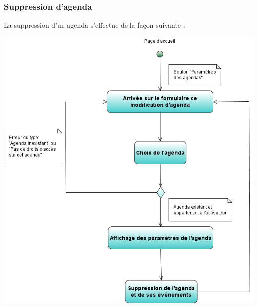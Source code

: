 \documentclass[12pt , a4paper]{article}
\begin{document}
\subsubsection{Suppression d'agenda}
\noindent La suppression d'un agenda s'effectue de la façon suivante :
\begin{center}
  \includegraphics[scale=0.6]{./images/diag_act_suppression_agenda.png}
\end{center}
\noindent 
\newpage
\end{document}
